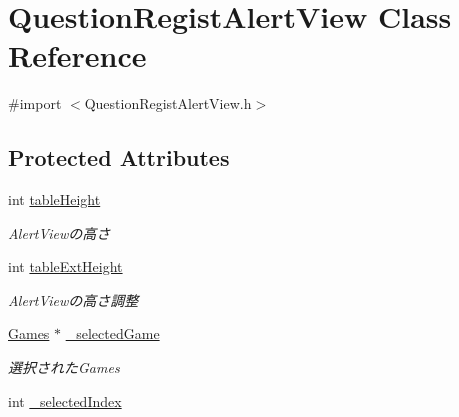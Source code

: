 \hypertarget{interface_question_regist_alert_view}{
\section{QuestionRegistAlertView Class Reference}
\label{interface_question_regist_alert_view}
}


{\ttfamily \#import $<$QuestionRegistAlertView.h$>$}

\subsection*{Protected Attributes}
\begin{DoxyCompactItemize}
\item 
\hypertarget{interface_question_regist_alert_view_a14a501764731bb6a9c33949e59b1924b}{
int \hyperlink{interface_question_regist_alert_view_a14a501764731bb6a9c33949e59b1924b}{tableHeight}}
\label{interface_question_regist_alert_view_a14a501764731bb6a9c33949e59b1924b}

\begin{DoxyCompactList}\small\item\em AlertViewの高さ \end{DoxyCompactList}\item 
\hypertarget{interface_question_regist_alert_view_a6e87325e5bc16bd42242d130951e0790}{
int \hyperlink{interface_question_regist_alert_view_a6e87325e5bc16bd42242d130951e0790}{tableExtHeight}}
\label{interface_question_regist_alert_view_a6e87325e5bc16bd42242d130951e0790}

\begin{DoxyCompactList}\small\item\em AlertViewの高さ調整 \end{DoxyCompactList}\item 
\hypertarget{interface_question_regist_alert_view_a9e614e1fb9be6c6be47b1be0ec035fe0}{
\hyperlink{interface_games}{Games} $\ast$ \hyperlink{interface_question_regist_alert_view_a9e614e1fb9be6c6be47b1be0ec035fe0}{\_\-selectedGame}}
\label{interface_question_regist_alert_view_a9e614e1fb9be6c6be47b1be0ec035fe0}

\begin{DoxyCompactList}\small\item\em 選択されたGames \end{DoxyCompactList}\item 
\hypertarget{interface_question_regist_alert_view_a15a97997c4826ef25dc2bc983ef4e563}{
int \hyperlink{interface_question_regist_alert_view_a15a97997c4826ef25dc2bc983ef4e563}{\_\-selectedIndex}}
\label{interface_question_regist_alert_view_a15a97997c4826ef25dc2bc983ef4e563}


\end{DoxyCompactItemize}
